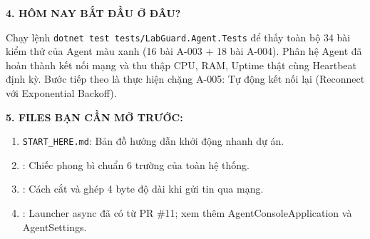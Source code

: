 \documentclass[12pt,a4paper]{article}
\begin{document}
\begin{tcolorbox}[enhanced, colback=lgLightGreen, colframe=lgForestGreen, boxrule=1pt, arc=2mm, top=2.5mm, bottom=2.5mm, left=3mm, right=3mm]
{\large\bfseries\color{lgForestGreen} 4. HÔM NAY BẮT ĐẦU Ở ĐÂU?}\par
\vspace{1mm}
Chạy lệnh \texttt{dotnet test tests/LabGuard.Agent.Tests} để thấy toàn bộ 34 bài kiểm thử của Agent màu xanh (16 bài A-003 + 18 bài A-004). Phân hệ Agent đã hoàn thành kết nối mạng và thu thập CPU, RAM, Uptime thật cùng Heartbeat định kỳ. Bước tiếp theo là thực hiện chặng A-005: Tự động kết nối lại (Reconnect với Exponential Backoff).
\end{tcolorbox}
\vspace{2mm}

\begin{tcolorbox}[enhanced, colback=lgLightSlate, colframe=lgSlate, boxrule=1pt, arc=2mm, top=2.5mm, bottom=2.5mm, left=3mm, right=3mm]
{\large\bfseries\color{lgSlate} 5. FILES BẠN CẦN MỞ TRƯỚC:}\par
\vspace{1mm}
\begin{enumerate}[leftmargin=1.5em, itemsep=1pt, topsep=1pt]
  \item \texttt{START\_HERE.md}: Bản đồ hướng dẫn khởi động nhanh dự án.
  \item {}: Chiếc phong bì chuẩn 6 trường của toàn hệ thống.
  \item {}: Cách cắt và ghép 4 byte độ dài khi gửi tin qua mạng.
  \item {}: Launcher async đã có từ PR \#11; xem thêm AgentConsoleApplication và AgentSettings.
\end{enumerate}
\end{tcolorbox}

\newpage

\setcounter{page}{3}

\setcounter{tocdepth}{2}
\renewcommand{\contentsname}{MỤC LỤC}
\tableofcontents
\newpage

\setcounter{page}{1}


\end{document}
